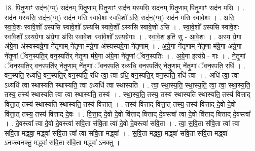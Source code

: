 \documentclass[17pt]{extarticle}
\begin{document}
18. पि॒तृ॒णाꣳ सद॑न॒(ग्म्॒) सद॑नम् पितृ॒णाम् पि॑तृ॒णाꣳ सद॑न मस्यसि॒ सद॑नम् पितृ॒णाम् पि॑तृ॒णाꣳ सद॑न मसि । . सद॑न मस्यसि॒ सद॑न॒(ग्म्॒) सद॑न मसि स्वावे॒शः स्वा॑वे॒शो॑ ऽसि॒ सद॑न॒(ग्म्॒) सद॑न मसि स्वावे॒शः । . अ॒सि॒ स्वा॒वे॒शः स्वा॑वे॒शो᳚ ऽस्यसि स्वावे॒शो᳚ ऽस्यसि स्वावे॒शो᳚ ऽस्यसि स्वावे॒शो॑ ऽसि । . स्वा॒वे॒शो᳚ ऽस्यसि स्वावे॒शः स्वा॑वे॒शो᳚ ऽस्यग्रे॒गा अ॑ग्रे॒गा अ॑सि स्वावे॒शः स्वा॑वे॒शो᳚ ऽस्यग्रे॒गाः । . स्वा॒वे॒श इति॑ सु - आ॒वे॒शः । . अ॒स्य॒ ग्रे॒गा अ॑ग्रे॒गा अ॑स्यस्यग्रे॒गा ने॑तृ॒णाम् ने॑तृ॒णा म॑ग्रे॒गा अ॑स्यस्यग्रे॒गा ने॑तृ॒णाम् । . अ॒ग्रे॒गा ने॑तृ॒णाम् ने॑तृ॒णा म॑ग्रे॒गा अ॑ग्रे॒गा ने॑तृ॒णां ॅवन॒स्पति॒र् वन॒स्पति॑र् नेतृ॒णा म॑ग्रे॒गा अ॑ग्रे॒गा ने॑तृ॒णां ॅवन॒स्पतिः॑ । . अ॒ग्रे॒गा इत्य॑ग्रे - गाः । . ने॒तृ॒णां ॅवन॒स्पति॒र् वन॒स्पति॑र् नेतृ॒णाम् ने॑तृ॒णां ॅवन॒स्पति॒ रध्यधि॒ वन॒स्पति॑र् नेतृ॒णाम् ने॑तृ॒णां ॅवन॒स्पति॒ रधि॑ । . वन॒स्पति॒ रध्यधि॒ वन॒स्पति॒र् वन॒स्पति॒ रधि॑ त्वा॒ त्वा ऽधि॒ वन॒स्पति॒र् वन॒स्पति॒ रधि॑ त्वा । . अधि॑ त्वा॒ त्वा ऽध्यधि॑ त्वा स्थास्यति स्थास्यति॒ त्वा ऽध्यधि॑ त्वा स्थास्यति । . त्वा॒ स्था॒स्य॒ति॒ स्था॒स्य॒ति॒ त्वा॒ त्वा॒ स्था॒स्य॒ति॒ तस्य॒ तस्य॑ स्थास्यति त्वा त्वा स्थास्यति॒ तस्य॑ । . स्था॒स्य॒ति॒ तस्य॒ तस्य॑ स्थास्यति स्थास्यति॒ तस्य॑ वित्ताद् वित्ता॒त् तस्य॑ स्थास्यति स्थास्यति॒ तस्य॑ वित्तात् । . तस्य॑ वित्ताद् वित्ता॒त् तस्य॒ तस्य॑ वित्ताद् दे॒वो दे॒वो वि॑त्ता॒त् तस्य॒ तस्य॑ वित्ताद् दे॒वः । . वि॒त्ता॒द् दे॒वो दे॒वो वि॑त्ताद् वित्ताद् दे॒वस्त्वा᳚ त्वा दे॒वो वि॑त्ताद् वित्ताद् दे॒वस्त्वा᳚ । . दे॒वस्त्वा᳚ त्वा दे॒वो दे॒वस्त्वा॑ सवि॒ता स॑वि॒ता त्वा॑ दे॒वो दे॒वस्त्वा॑ सवि॒ता । . त्वा॒ स॒वि॒ता स॑वि॒ता त्वा᳚ त्वा सवि॒ता मद्ध्वा॒ मद्ध्वा॑ सवि॒ता त्वा᳚ त्वा सवि॒ता मद्ध्वा᳚ । . स॒वि॒ता मद्ध्वा॒ मद्ध्वा॑ सवि॒ता स॑वि॒ता मद्ध्वा॑ ऽनक्त्वनक्तु॒ मद्ध्वा॑ सवि॒ता स॑वि॒ता मद्ध्वा॑ ऽनक्तु । \newline
\end{document}
